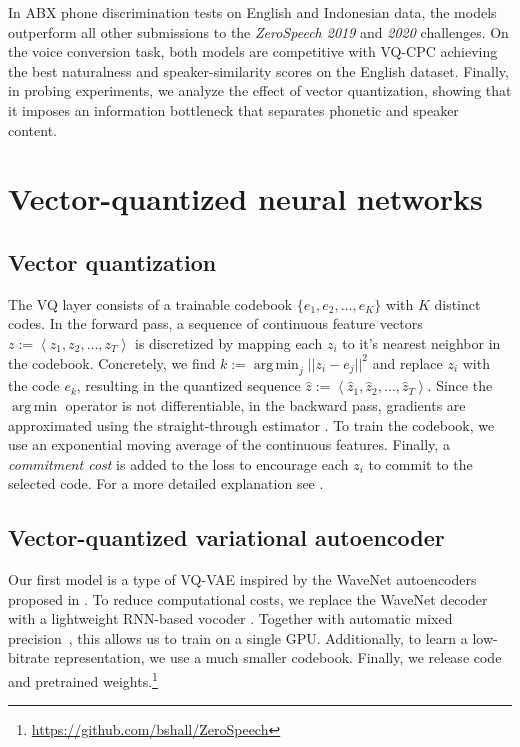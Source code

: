 \documentclass[a4paper]{article}
\DeclareMathOperator*{\argmin}{arg\,min}
\begin{document}
In ABX phone discrimination tests on English and Indonesian data, the models outperform all other submissions to the \textit{ZeroSpeech 2019} and \textit{2020} challenges.
On the voice conversion task, both models are competitive with VQ-CPC achieving the best naturalness and speaker-similarity scores on the English dataset.
Finally, in probing experiments, we analyze the effect of vector quantization, showing that it imposes an information bottleneck that separates phonetic and speaker content.


%
 \section{Vector-quantized neural networks}



\subsection{Vector quantization}
\label{sec:vq-layer}

The VQ layer consists of a trainable codebook $\{e_1, e_2, \ldots, e_K \}$ with $K$ distinct codes. 
In the forward pass, a sequence of continuous feature vectors $z  := \left\langle z_1, z_2, \ldots, z_T \right\rangle$ is discretized by mapping each $z_i$ to it's nearest neighbor in the codebook. 
Concretely, we find $k := \argmin_j || z_i - e_j ||^2$ and replace $z_i$ with the code $e_k$, resulting in the quantized sequence $\hat{z} := \left\langle \hat{z}_1, \hat{z}_2, \ldots, \hat{z}_T \right\rangle$. 
Since the $\argmin$ operator is not differentiable, in the backward pass, gradients are approximated using the straight-through estimator \cite{bengio+etal_arxiv13}. 
To train the codebook, we use an exponential moving average of the continuous features. Finally, a \textit{commitment cost} is added to the loss to encourage each $z_i$ to commit to the selected code. 
For a more detailed explanation see \cite{vandenoord+etal_neurips17}.

\subsection{Vector-quantized variational autoencoder}
\label{sec:vqvae}

Our first model is a type of VQ-VAE inspired by the WaveNet autoencoders proposed in \cite{chorowski+etal_taslp19}. To reduce computational costs, we replace the WaveNet decoder~\cite{vandenoord+etal_arxiv16} with a lightweight RNN-based vocoder \cite{lorenzotrueb+etal_interspeech19}.
Together with automatic mixed precision~\cite{micikevicius+etal_iclr18}, this allows us to train on a single GPU.
Additionally, to learn a low-bitrate representation, we use a much smaller codebook.
Finally, we release code and pretrained weights.\footnote{\scriptsize \url{https://github.com/bshall/ZeroSpeech}}
\end{document}
